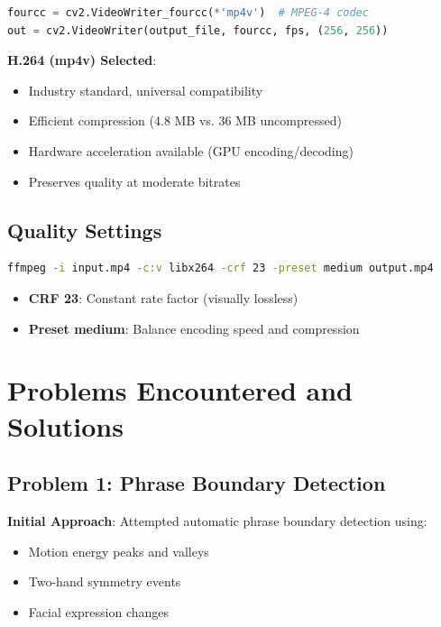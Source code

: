 \documentclass[11pt,a4paper]{article}
\begin{document}
\begin{lstlisting}[language=Python]
fourcc = cv2.VideoWriter_fourcc(*'mp4v')  # MPEG-4 codec
out = cv2.VideoWriter(output_file, fourcc, fps, (256, 256))
\end{lstlisting}

\textbf{H.264 (mp4v) Selected}:
\begin{itemize}
    \item Industry standard, universal compatibility
    \item Efficient compression (4.8 MB vs. 36 MB uncompressed)
    \item Hardware acceleration available (GPU encoding/decoding)
    \item Preserves quality at moderate bitrates
\end{itemize}

\subsection{Quality Settings}

\begin{lstlisting}[language=Bash]
ffmpeg -i input.mp4 -c:v libx264 -crf 23 -preset medium output.mp4
\end{lstlisting}

\begin{itemize}
    \item \textbf{CRF 23}: Constant rate factor (visually lossless)
    \item \textbf{Preset medium}: Balance encoding speed and compression
\end{itemize}

\section{Problems Encountered and Solutions}

\subsection{Problem 1: Phrase Boundary Detection}

\textbf{Initial Approach}: Attempted automatic phrase boundary detection using:
\begin{itemize}
    \item Motion energy peaks and valleys
    \item Two-hand symmetry events
    \item Facial expression changes
\end{itemize}
\end{document}
